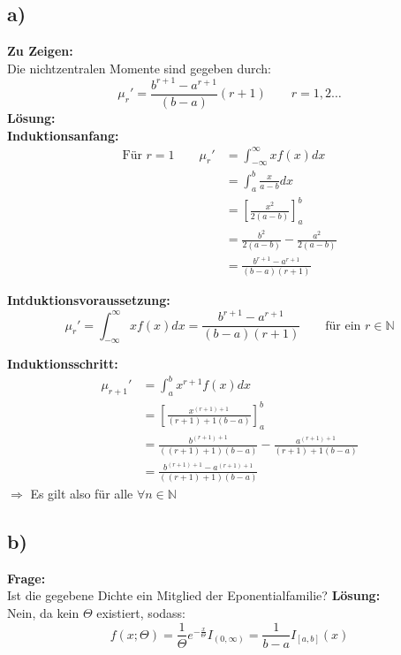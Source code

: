 \documentclass{article}
\begin{document}
\subsection*{a)}
\textbf{Zu Zeigen:}\\

Die nichtzentralen Momente sind gegeben durch: 
\[\mu_r'= \frac{b^{r+1}- a^{r+1}}{(b-a)}(r+1)\qquad r=1,2 \ldots\]
\textbf{Lösung:}\\

\textbf{Induktionsanfang:} \\

\begin{align*}
    \text{Für } r = 1\qquad \mu_r' &= \int_{-\infty}^{\infty} x f(x) dx \\
    &= \int_{a}^{b} \frac{x}{a - b} dx \\
    &= \left[\frac{x^2}{2(a-b)}\right]_a^b \\
    &= \frac{b^2}{2 (a-b)} - \frac{a^2}{2 (a-b)} \\
    &= \frac{b^{r+1} - a^{r+1}}{(b-a) (r+1)}
\end{align*}

\textbf{Intduktionsvoraussetzung:}\\

\[\mu_r' = \int_{-\infty}^{\infty}xf(x)dx = \frac{b^{r+1} - a^{r+1}}{(b-a) (r+1)}  \qquad \text{für ein } r \in \mathbb{N}  \]

\textbf{Induktionsschritt:}
\begin{align*}
    \mu_{r+1}' &= \int_{a}^{b} x^{r+1} f(x) dx \\
    &= \left[\frac{x^{(r+1)+1}}{(r+1)+1(b-a)}\right]_a^b \\
    &= \frac{b^{(r+1)+1}}{((r+1)+1)(b-a)} - \frac{a^{(r+1)+1}}{(r+1)+1(b-a)} \\
    &= \frac{b^{(r+1)+1}- a^{(r+1)+1}}{((r+1)+1)(b-a)}
\end{align*}
$\Longrightarrow$ Es gilt also für alle $\forall n \in \mathbb{N}$
\subsection*{b)}
\textbf{Frage:} \\

Ist die gegebene Dichte ein Mitglied der Eponentialfamilie?
\textbf{Lösung:} \\

Nein, da kein $\Theta$ existiert, sodass: \[f(x;\Theta) = \frac{1}{\Theta}e^{-\frac{x}{\Theta}}I_{(0, \infty)} = \frac{1}{b-a} I_{[a,b]}(x)\]
\end{document}
